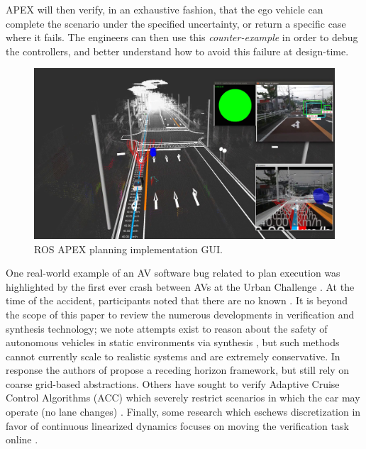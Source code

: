  
 
 APEX will then verify, in an exhaustive fashion, that the ego vehicle can complete the scenario under the specified uncertainty, or return a specific case where it fails.
 The engineers can then use this \emph{counter-example} in order to debug the controllers, and better understand how to avoid this failure at design-time. 
 \begin{figure}[h]
 	\centering
 	\includegraphics[width = \textwidth]{figures/apex_planning.png}
 	\vspace{-10pt}
 	\caption{ROS APEX planning implementation GUI.}
 	\vspace{-10pt}
 	\label{fig:ros}
 \end{figure}
 
 One real-world example of an AV software bug related to plan execution was highlighted by the first ever crash between AVs at the Urban Challenge \cite{fletcher2008cornell}. At the time of the accident, participants noted that there are no known  \cite{urmson2008autonomous}. It is beyond the scope of this paper to review the numerous developments in verification and synthesis technology;
 we note attempts exist to reason about the safety of autonomous vehicles in static environments via synthesis \cite{Wongpiromsarn2010}, but such methods cannot currently scale to realistic systems and are extremely conservative. In response the authors of \cite{Wongpiromsarn2010} propose a receding horizon framework, but still rely on coarse grid-based abstractions. Others have sought to verify Adaptive Cruise Control Algorithms (ACC) which severely restrict scenarios in which the car may operate (no lane changes) \cite{nilssoncorrect}. Finally, some research which eschews discretization in favor of continuous linearized dynamics focuses on moving the verification task online \cite{althoff2012}.
 
